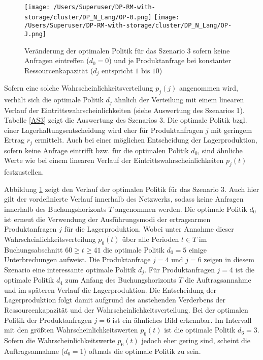 \begin{figure}[h!]     
\begin{center}
\texttt{[image: /Users/Superuser/DP-RM-with-storage/cluster/DP\_N\_Lang/OP-0.png]}
\texttt{[image: /Users/Superuser/DP-RM-with-storage/cluster/DP\_N\_Lang/OP-J.png]}
    \caption{Veränderung der optimalen Politik für das Szenario 3 sofern keine Anfragen eintreffen ($d_0=0$) und je Produktanfrage bei konstanter Ressourcenkapazität ($d_j\text{ entspricht }1\text{ bis }10$)}  \label{SV3}
  \end{center}
\end{figure}

Sofern eine solche Wahrscheinlichkeitsverteilung $p_j(j)$ angenommen wird, verhält sich die optimale Politik $d_j$ ähnlich der Verteilung mit einem linearen Verlauf der Eintrittswahrscheinlichkeiten (siehe Auswertung des Szenarios 1). Tabelle \ref{AS3} zeigt die Auswertung des Szenarios 3. Die optimale Politik bzgl. einer Lagerhaltungsentscheidung wird eher für Produktanfragen $j$ mit geringem Ertrag $r_j$ ermittelt. Auch bei einer möglichen Entscheidung der Lagerproduktion, sofern keine Anfrage eintrifft bzw. für die optimalen Politik $d_0$, sind ähnliche Werte wie bei einem linearen Verlauf der Eintrittswahrscheinlichkeiten $p_j(t)$ festzustellen.

Abbildung \ref{SV3} zeigt den Verlauf der optimalen Politik für das Szenario 3. Auch hier gilt der vordefinierte Verlauf innerhalb des Netzwerks, sodass keine Anfragen innerhalb des Buchungshorizonts $T$ angenommen werden. Die optimale Politik $d_0$ ist erneut die Verwendung der Ausführungsmodi der ertragsarmen Produktanfragen $j$ für die Lagerproduktion. Wobei unter Annahme dieser Wahrscheinlichkeitsverteilung $p_0(t)$ über alle Perioden $t\in T$ im Buchungsabschnitt $60\ge t \ge 41$ die optimale Politik $d_0=5$ einige Unterbrechungen aufweist. Die Produktanfrage $j=4$ und $j=6$ zeigen in diesem Szenario eine interessante optimale Politik $d_j$. Für Produktanfragen $j=4$ ist die optimale Politik $d_4$ zum Anfang des Buchungshorizonts $T$ die Auftragsannahme und im späteren Verlauf die Lagerproduktion. Die Entscheidung der Lagerproduktion folgt damit aufgrund des anstehenden Verderbens der Ressourcenkapazität und der Wahrscheinlichkeitsverteilung. Bei der optimalen Politik der Produktanfragen $j=6$ ist ein ähnliches Bild erkennbar. Im Intervall mit den größten Wahrscheinlichkeitswerten $p_6(t)$ ist die optimale Politik $d_6=3$. Sofern die Wahrscheinlichkeitswerte $p_6(t)$ jedoch eher gering sind, scheint die Auftragsannahme ($d_6=1$) oftmals die optimale Politik zu sein. 


